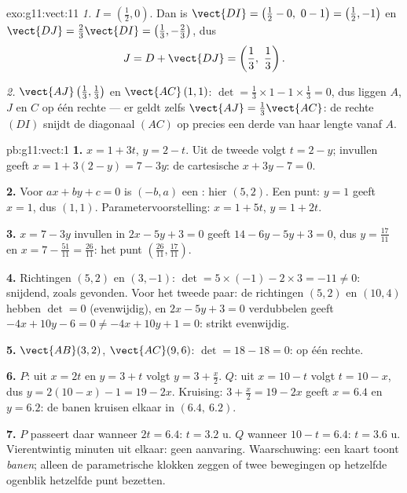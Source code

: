 \begin{solution}{exo:g11:vect:11}
\emph{1.} $I = \left(\frac12, 0\right)$. Dan is
$\vect{DI} = \left(\frac12 - 0,\ 0 - 1\right) = \left(\frac12, -1\right)$ en
$\vect{DJ} = \frac23\vect{DI} = \left(\frac13, -\frac23\right)$, dus
\[
J = D + \vect{DJ} = \left(\frac13,\ \frac13\right).
\]

\emph{2.} $\vect{AJ}\left(\frac13, \frac13\right)$ en $\vect{AC}\,(1, 1)$:
$\det = \frac13 \times 1 - 1 \times \frac13 = 0$, dus liggen $A$, $J$ en $C$
op één rechte --- er geldt zelfs $\vect{AJ} = \frac13\vect{AC}$: de rechte
$(DI)$ snijdt de diagonaal $(AC)$ op precies een derde van haar lengte
vanaf $A$.
\end{solution}

\begin{solution}{pb:g11:vect:1}
\textbf{1.} $x = 1 + 3t$, $y = 2 - t$. Uit de tweede volgt $t = 2 - y$;
invullen geeft $x = 1 + 3(2 - y) = 7 - 3y$: de cartesische 
$x + 3y - 7 = 0$.

\textbf{2.} Voor $ax + by + c = 0$ is $(-b, a)$ een : hier
$(5, 2)$. Een punt: $y = 1$ geeft $x = 1$, dus $(1, 1)$.
Parametervoorstelling: $x = 1 + 5t$, $y = 1 + 2t$.

\textbf{3.} $x = 7 - 3y$ invullen in $2x - 5y + 3 = 0$ geeft
$14 - 6y - 5y + 3 = 0$, dus $y = \frac{17}{11}$ en
$x = 7 - \frac{51}{11} = \frac{26}{11}$: het punt
$\left(\frac{26}{11}, \frac{17}{11}\right)$.

\textbf{4.} Richtingen $(5, 2)$ en $(3, -1)$:
$\det = 5 \times (-1) - 2 \times 3 = -11 \neq 0$: snijdend, zoals gevonden.
Voor het tweede paar: de richtingen $(5, 2)$ en $(10, 4)$ hebben
$\det = 0$ (evenwijdig), en $2x - 5y + 3 = 0$ verdubbelen geeft
$-4x + 10y - 6 = 0 \neq -4x + 10y + 1 = 0$: strikt evenwijdig.

\textbf{5.} $\vect{AB}(3, 2)$, $\vect{AC}(9, 6)$: $\det = 18 - 18 = 0$: op
één rechte.

\textbf{6.} $P$: uit $x = 2t$ en $y = 3 + t$ volgt $y = 3 + \frac x2$. $Q$:
uit $x = 10 - t$ volgt $t = 10 - x$, dus $y = 2(10 - x) - 1 = 19 - 2x$.
Kruising: $3 + \frac x2 = 19 - 2x$ geeft $x = 6.4$ en $y = 6.2$: de banen
kruisen elkaar in $(6.4,\ 6.2)$.

\textbf{7.} $P$ passeert daar wanneer $2t = 6.4$: $t = 3.2$ u. $Q$ wanneer
$10 - t = 6.4$: $t = 3.6$ u. Vierentwintig minuten uit elkaar: geen
aanvaring. Waarschuwing: een kaart toont \emph{banen}; alleen de
parametrische klokken zeggen of twee bewegingen op hetzelfde ogenblik
hetzelfde punt bezetten.


\end{solution}
